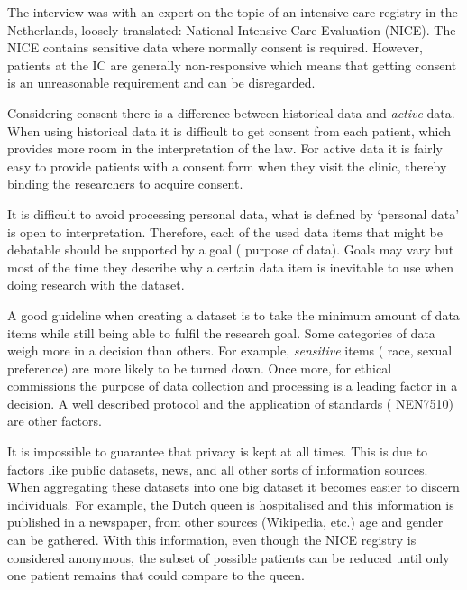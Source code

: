 The interview was with an expert on the topic of an intensive care registry in the Netherlands, loosely translated: National Intensive Care Evaluation (NICE).
The NICE contains sensitive data where normally consent is required. 
However, patients at the IC are generally non-responsive which means that getting consent is an unreasonable requirement and can be disregarded.

Considering consent there is a difference between historical data and \emph{active} data.
When using historical data it is difficult to get consent from each patient, which provides more room in the interpretation of the law.
For active data it is fairly easy to provide patients with a consent form when they visit the clinic, thereby binding the researchers to acquire consent.

It is difficult to avoid processing personal data, \ie{} what is defined by `personal data' is open to interpretation.
Therefore, each of the used data items that might be debatable should be supported by a goal (\ie{} purpose of data).
Goals may vary but most of the time they describe why a certain data item is inevitable to use when doing research with the dataset.

A good guideline when creating a dataset is to take the minimum amount of data items while still being able to fulfil the research goal.
Some categories of data weigh more in a decision than others.
For example, \emph{sensitive} items (\eg{} race, sexual preference) are more likely to be turned down.
Once more, for ethical commissions the purpose of data collection and processing is a leading factor in a decision. 
A well described protocol and the application of standards (\eg{} NEN7510) are other factors.

It is impossible to guarantee that privacy is kept at all times.
This is due to factors like public datasets, news, and all other sorts of information sources.
When aggregating these datasets into one big dataset it becomes easier to discern individuals. 
For example, the Dutch queen is hospitalised and this information is published in a newspaper, from other sources (Wikipedia, etc.) age and gender can be gathered.
With this information, even though the NICE registry is considered anonymous, the subset of possible patients can be reduced until only one patient remains that could compare to the queen.

